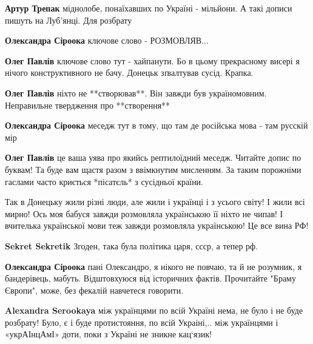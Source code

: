 \begin{itemize}
\begin{itemize}
\begin{itemize}
\textbf{Артур Трепак} міднолобе, понаїхавших по Україні - мільйони. А такі дописи пишуть на Луб'янці. Для розбрату
\end{itemize} %

\textbf{Олександра Сіроока} ключове слово - РОЗМОВЛЯВ...

\begin{itemize} %
\textbf{Олег Павлів} ключове слово тут - хайпанути. Бо в цьому прекрасному висері я нічого конструктивного не бачу.
Донецьк зґвалтував сусід. Крапка.

\textbf{Олег Павлів} ніхто не **створював**. Він завжди був україномовним.
Неправильне твердження про **створення**

\textbf{Олександра Сіроока} меседж тут в тому, що там де російська мова - там русскій мір

\textbf{Олег Павлів} це ваша уява про якийсь рептилоїдний меседж.
Читайте допис по буквам! Та буде вам щастя разом з ввімкнутим мисленням.
За таким порожніми гаслами часто криється *пісатєль* з сусідньої країни.
\end{itemize} %


Так в Донецьку жили різні люди, але жили і українці і з усього світу! І жили
всі мирно! Ось моя бабуся завжди розмовляла українською її ніхто не чипав! І
вчителька української мови теж завжди розмовляла українською! Це все вина РФ!

\begin{itemize} %
\textbf{Sekret Sekretik} Згоден, така була політика царя, ссср, а тепер рф.
\end{itemize} %

\textbf{Олександра Сіроока} пані Олександро, я нікого не повчаю, та й не розумник, я бандерівець, мабуть. Відштовхуюся від історичних фактів. Прочитайте "Браму Європи", може, без фекалій навчетеся говорити.

\textbf{Alexandra Serookaya} між українцями по всій Україні нема, не було і не буде розбрату! Було, є і буде протистояння, по всій Украіні,.. між українцями і «укрАІнцАмІ» доти, поки з Україні не зникне кац‘язик!

\end{itemize} %



\end{itemize}
